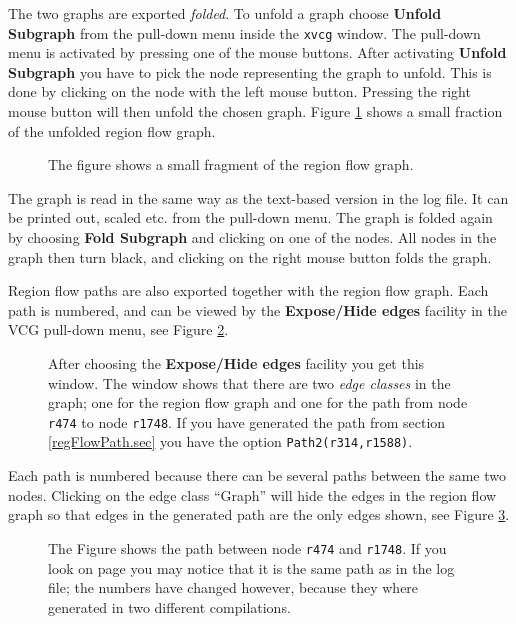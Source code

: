 \documentclass[12pt]{book}
\begin{document}
The two graphs are exported \emph{folded}. To unfold a graph choose
\textbf{Unfold Subgraph} from the pull-down menu inside the
\texttt{xvcg} window. The pull-down menu is activated by pressing one
of the mouse buttons. After activating \textbf{Unfold Subgraph} you
have to pick the node representing the graph to unfold. This is done
by clicking on the node with the left mouse button. Pressing the right
mouse button will then unfold the chosen graph. Figure \ref{vcg2.fig}
shows a small fraction of the unfolded region flow graph.

\begin{figure}[htb]
\begin{center}
  \caption{The figure shows a small fragment of
          the region flow graph.}\label{vcg2.fig}
\end{center}
\end{figure}
The graph is read in the same way as the text-based version in the log
file. It can be printed out, scaled etc. from the pull-down
menu. The graph is folded again by choosing \textbf{Fold Subgraph} and clicking
on one of the nodes. All nodes in the graph then turn black, and clicking
on the right mouse button folds the graph.

Region flow paths are also exported together with the region flow
graph. Each path is numbered, and can be viewed by the \textbf{Expose/Hide
  edges} facility in the VCG pull-down menu, see Figure \ref{vcg3.fig}.
\begin{figure}[htb]
\begin{center}
  \caption{After choosing the
    \textbf{Expose/Hide edges} facility you get this window. The window
    shows that there are two \emph{edge classes} in the graph; one for the
    region flow graph and one for the path from node \texttt{r474} to node
    \texttt{r1748}. If you have generated the path from section
    \ref{regFlowPath.sec} you have the option
    \texttt{Path2(r314,r1588)}.}\label{vcg3.fig}
\end{center}
\end{figure}
Each path is numbered because there can be several paths between the same
two nodes. Clicking on the edge class ``Graph'' will hide the edges in the
region flow graph so that edges in the generated path are the only edges
shown, see Figure \ref{vcg4.fig}.
\begin{figure}[htb]
\begin{center}
  \caption{The Figure shows the path between
          node \texttt{r474} and \texttt{r1748}. If you look on page
          \pageref{reg_flow_graph.ex} you may notice that it is the same
          path as in the log file; the numbers have changed however,
          because they where generated in two different
          compilations.}\label{vcg4.fig}
\end{center}
\end{figure}
\end{document}
